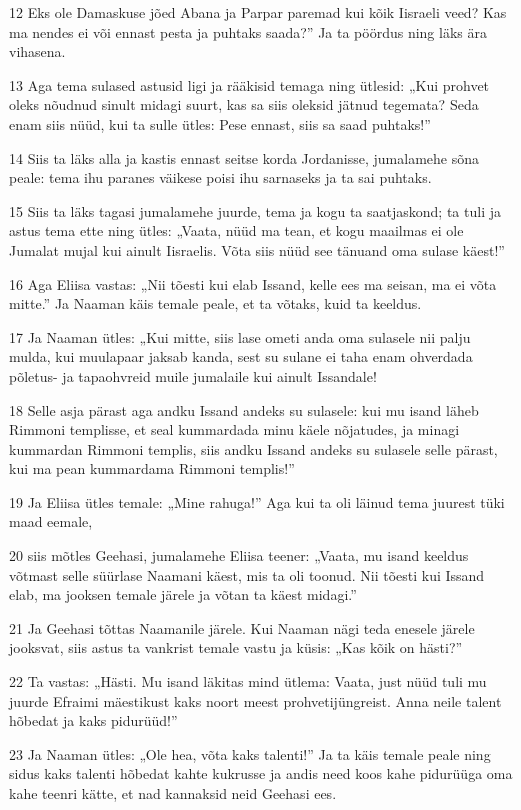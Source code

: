 \par 12 Eks ole Damaskuse jõed Abana ja Parpar paremad kui kõik Iisraeli veed? Kas ma nendes ei või ennast pesta ja puhtaks saada?” Ja ta pöördus ning läks ära vihasena.
\par 13 Aga tema sulased astusid ligi ja rääkisid temaga ning ütlesid: „Kui prohvet oleks nõudnud sinult midagi suurt, kas sa siis oleksid jätnud tegemata? Seda enam siis nüüd, kui ta sulle ütles: Pese ennast, siis sa saad puhtaks!”
\par 14 Siis ta läks alla ja kastis ennast seitse korda Jordanisse, jumalamehe sõna peale: tema ihu paranes väikese poisi ihu sarnaseks ja ta sai puhtaks.
\par 15 Siis ta läks tagasi jumalamehe juurde, tema ja kogu ta saatjaskond; ta tuli ja astus tema ette ning ütles: „Vaata, nüüd ma tean, et kogu maailmas ei ole Jumalat mujal kui ainult Iisraelis. Võta siis nüüd see tänuand oma sulase käest!”
\par 16 Aga Eliisa vastas: „Nii tõesti kui elab Issand, kelle ees ma seisan, ma ei võta mitte.” Ja Naaman käis temale peale, et ta võtaks, kuid ta keeldus.
\par 17 Ja Naaman ütles: „Kui mitte, siis lase ometi anda oma sulasele nii palju mulda, kui muulapaar jaksab kanda, sest su sulane ei taha enam ohverdada põletus- ja tapaohvreid muile jumalaile kui ainult Issandale!
\par 18 Selle asja pärast aga andku Issand andeks su sulasele: kui mu isand läheb Rimmoni templisse, et seal kummardada minu käele nõjatudes, ja minagi kummardan Rimmoni templis, siis andku Issand andeks su sulasele selle pärast, kui ma pean kummardama Rimmoni templis!”
\par 19 Ja Eliisa ütles temale: „Mine rahuga!” Aga kui ta oli läinud tema juurest tüki maad eemale,
\par 20 siis mõtles Geehasi, jumalamehe Eliisa teener: „Vaata, mu isand keeldus võtmast selle süürlase Naamani käest, mis ta oli toonud. Nii tõesti kui Issand elab, ma jooksen temale järele ja võtan ta käest midagi.”
\par 21 Ja Geehasi tõttas Naamanile järele. Kui Naaman nägi teda enesele järele jooksvat, siis astus ta vankrist temale vastu ja küsis: „Kas kõik on hästi?”
\par 22 Ta vastas: „Hästi. Mu isand läkitas mind ütlema: Vaata, just nüüd tuli mu juurde Efraimi mäestikust kaks noort meest prohvetijüngreist. Anna neile talent hõbedat ja kaks pidurüüd!”
\par 23 Ja Naaman ütles: „Ole hea, võta kaks talenti!” Ja ta käis temale peale ning sidus kaks talenti hõbedat kahte kukrusse ja andis need koos kahe pidurüüga oma kahe teenri kätte, et nad kannaksid neid Geehasi ees.
